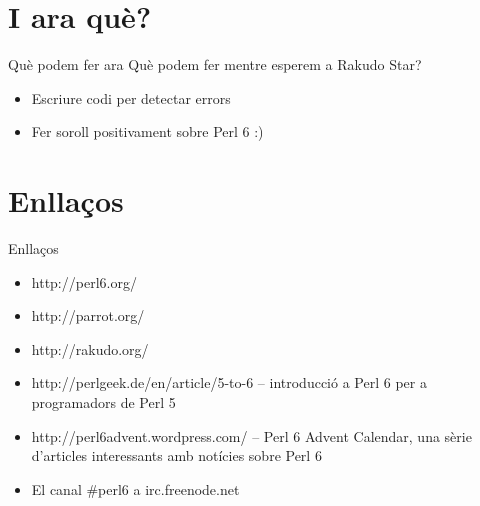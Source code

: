 \documentclass{beamer}
\begin{document}
			\section{I ara què?}
\begin{frame}{Què podem fer ara}
	Què podem fer mentre esperem a Rakudo Star?
	\begin{itemize}
		\item Escriure codi per detectar errors
		\item Fer soroll positivament sobre Perl 6 :)
	\end{itemize}
\end{frame}
			\section{Enllaços}

\begin{frame}{Enllaços}
	\begin{itemize}
		\item {}
			{http://perl6.org/}
		\item {}
			{http://parrot.org/}
		\item {}
			{http://rakudo.org/}
		\item
		{http://perlgeek.de/en/article/5-to-6}
		-- introducció a Perl 6 per a programadors de Perl 5
		
		\item {}
			{http://perl6advent.wordpress.com/}
			-- Perl 6 Advent Calendar, una sèrie d'articles
            interessants amb notícies sobre Perl 6
		\item El canal \#perl6 a irc.freenode.net
	\end{itemize}
\end{frame}
\end{document}
